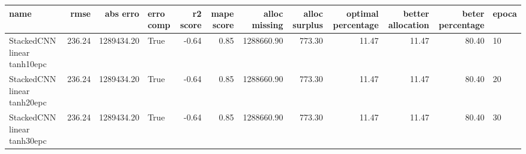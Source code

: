 \begin{tabular}{lrrlrrrrrrrl}
\toprule
name & rmse & abs erro & erro comp & r2 score & mape score & alloc missing & alloc surplus & optimal percentage & better allocation & beter percentage & epoca \\
\midrule
StackedCNN linear tanh10epc & 236.24 & 1289434.20 & True & -0.64 & 0.85 & 1288660.90 & 773.30 & 11.47 & 11.47 & 80.40 & 10 \\
StackedCNN linear tanh20epc & 236.24 & 1289434.20 & True & -0.64 & 0.85 & 1288660.90 & 773.30 & 11.47 & 11.47 & 80.40 & 20 \\
StackedCNN linear tanh30epc & 236.24 & 1289434.20 & True & -0.64 & 0.85 & 1288660.90 & 773.30 & 11.47 & 11.47 & 80.40 & 30 \\
\bottomrule
\end{tabular}
